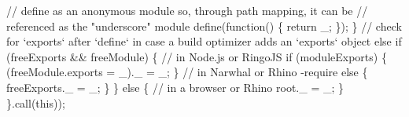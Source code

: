 \begin{DoxyCodeInclude}
    \textcolor{comment}{// define as an anonymous module so, through path mapping, it can be}
    \textcolor{comment}{// referenced as the "underscore" module}
    define(\textcolor{keyword}{function}() \{
      \textcolor{keywordflow}{return} \_;
    \});
  \}
  \textcolor{comment}{// check for `exports` after `define` in case a build optimizer adds an `exports` object}
  \textcolor{keywordflow}{else} \textcolor{keywordflow}{if} (freeExports && freeModule) \{
    \textcolor{comment}{// in Node.js or RingoJS}
    \textcolor{keywordflow}{if} (moduleExports) \{
      (freeModule.exports = \_).\_ = \_;
    \}
    \textcolor{comment}{// in Narwhal or Rhino -require}
    \textcolor{keywordflow}{else} \{
      freeExports.\_ = \_;
    \}
  \}
  \textcolor{keywordflow}{else} \{
    \textcolor{comment}{// in a browser or Rhino}
    root.\_ = \_;
  \}
\}.call(\textcolor{keyword}{this}));
\end{DoxyCodeInclude}
 